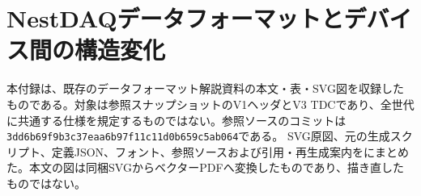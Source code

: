 \documentclass[../main.tex]{subfiles}
\begin{document}
\section{NestDAQデータフォーマットとデバイス間の構造変化}
\label{sec:nestdaq-dataformat}
本付録は、既存のデータフォーマット解説資料の本文・表・SVG図を収録したものである。対象は参照スナップショットのV1ヘッダとV3 TDCであり、全世代に共通する仕様を規定するものではない。参照ソースのコミットは\texttt{3dd6b69f9b3c37eaa6b97f11c11d0b659c5ab064}である。
SVG原図、元の生成スクリプト、定義JSON、フォント、参照ソースおよび引用・再生成案内をにまとめた。本文の図は同梱SVGからベクターPDFへ変換したものであり、描き直したものではない。

\end{document}
